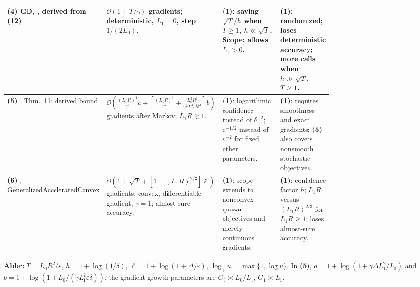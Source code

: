 \begin{table}[tp]
\begin{threeparttable}
\begin{tabularx}{\linewidth}{@{}>{\raggedright\arraybackslash}p{0.20\linewidth}>{\raggedright\arraybackslash}p{0.32\linewidth}>{\raggedright\arraybackslash}p{0.25\linewidth}>{\raggedright\arraybackslash}X@{}}
\midrule
\textbf{(4)} GD, \citep{goqJin2020v3}, derived from (12) & $\mathcal{O}(1+T/\gamma)$ gradients; deterministic, $L_1=0$, step $1/(2L_0)$. & \textbf{(1)}: saving $\sqrt T/h$ when $T\ge1$, $h\ll\sqrt T$. Scope: allows $L_1>0$. & \textbf{(1)}: randomized; loses deterministic accuracy; more calls when $h\gg\sqrt T$, $T\ge1$. \\
\midrule
\textbf{(5)} \citep{goqKovalev2026v2}, Thm.~11; derived bound & $\mathcal{O}\!\left(\frac{(L_1R)^4}{\gamma^6}a+\left[\frac{(L_1R)^3}{\gamma^2}+\frac{L_0^2R^2}{\gamma^2L_1^2\varepsilon^2\delta^2}\right]b\right)$ gradients after Markov; $L_1R\gtrsim1$. & \textbf{(1)}: logarithmic confidence instead of $\delta^{-2}$; $\varepsilon^{-1/2}$ instead of $\varepsilon^{-2}$ for fixed other parameters. & \textbf{(1)}: requires smoothness and exact gradients; \textbf{(5)} also covers nonsmooth stochastic objectives. \\
\midrule
\textbf{(6)} \citep{goqRepository}, Generalized\allowbreak Accelerated\allowbreak Convex & $\mathcal{O}(1+\sqrt T+[1+(L_1R)^{2/3}]\ell)$ gradients; convex, differentiable gradient, $\gamma=1$; almost-sure accuracy. & \textbf{(1)}: scope extends to nonconvex quasar objectives and merely continuous gradients. & \textbf{(1)}: confidence factor $h$; $L_1R$ versus $(L_1R)^{2/3}$ for $L_1R\ge1$; loses almost-sure accuracy. \\
\bottomrule
\end{tabularx}
\begin{tablenotes}[flushleft]\footnotesize
\item[] \textbf{Abbr:} $T=L_0R^2/\varepsilon$, $h=1+\log(1/\delta)$, $\ell=1+\log(1+\Delta/\varepsilon)$, $\log_+u=\max\{1,\log u\}$. In \textbf{(5)}, $a=1+\log(1+\gamma\Delta L_1^2/L_0)$ and $b=1+\log(1+L_0/(\gamma L_1^2\varepsilon\delta))$; the gradient-growth parameters are $G_0\asymp L_0/L_1$, $G_1\asymp L_1$.
\end{tablenotes}
\end{threeparttable}
\end{table}
\clearpage
